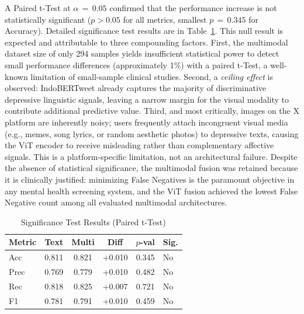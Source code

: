 \documentclass[conference]{IEEEtran}
\begin{document}
A Paired t-Test at $\alpha\,{=}\,0.05$ confirmed that the performance
increase is not statistically significant ($p > 0.05$ for all metrics,
smallest $p\,{=}\,0.345$ for Accuracy). Detailed significance test
results are in Table~\ref{tab:ttest}. This null result is expected and
attributable to three compounding factors. First, the multimodal dataset
size of only 294 samples yields insufficient statistical power to detect
small performance differences (approximately 1\%) with a paired t-Test,
a well-known limitation of small-sample clinical studies. Second, a
\emph{ceiling effect} is observed: IndoBERTweet already captures the
majority of discriminative depressive linguistic signals, leaving a
narrow margin for the visual modality to contribute additional
predictive value. Third, and most critically, images on the X platform
are inherently noisy; users frequently attach incongruent visual media
(e.g., memes, song lyrics, or random aesthetic photos) to depressive
texts, causing the ViT encoder to receive misleading rather than
complementary affective signals. This is a platform-specific limitation,
not an architectural failure. Despite the absence of statistical
significance, the multimodal fusion was retained because it is clinically
justified: minimizing False Negatives is the paramount objective in
any mental health screening system, and the ViT fusion achieved the
lowest False Negative count among all evaluated multimodal architectures.

\begin{table}[!ht]
\caption{Significance Test Results (Paired t-Test)}
\begin{center}
\begin{tabular}{|l|c|c|c|c|l|}
\hline
\textbf{Metric} & \textbf{Text} & \textbf{Multi} & \textbf{Diff} & \textbf{$p$-val} & \textbf{Sig.} \\
\hline
Acc  & 0.811 & 0.821 & +0.010 & 0.345 & No \\
Prec & 0.769 & 0.779 & +0.010 & 0.482 & No \\
Rec  & 0.818 & 0.825 & +0.007 & 0.721 & No \\
F1   & 0.781 & 0.791 & +0.010 & 0.459 & No \\
\hline
\end{tabular}
\label{tab:ttest}
\end{center}
\end{table}
\end{document}
